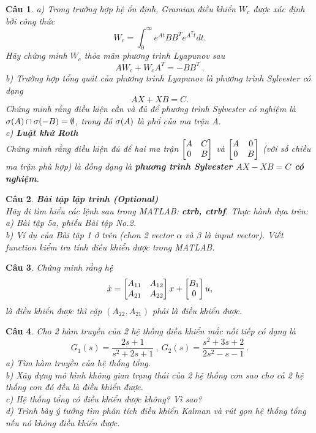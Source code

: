 \documentclass[11pt]{article}
\newtheorem{bt}{Câu}
\begin{document}
\begin{bt}
a) Trong trường hợp hệ ổn định, Gramian điều khiển $W_c$ được xác định bởi công thức
%
\[
W_c  = \int_0^{\infty} e^{At} BB^T e^{A^Tt} dt. 
\]
%
Hãy chứng minh $W_c$ thỏa mãn phương trình Lyapunov sau
%
\begin{equation}\label{lyap}
	A W_c + W_c A^T = - B B^T \ .
\end{equation}
%
b) Trường hợp tổng quát của phương trình Lyapunov là phương trình Sylvester có dạng
%
\begin{equation}\label{sylvester}
A X + X B = C.
\end{equation}
%
Chứng minh rằng điều kiện cần và đủ để phương trình Sylvester có nghiệm là 
$\sigma(A) \cap \sigma(-B) = \emptyset$, trong đó $\sigma(A)$ là phổ của ma trận A. \\
c) \textbf{Luật khử Roth} \\
Chứng minh rằng điều kiện đủ để hai ma trận $\begin{bmatrix} A & C\\0 & B \end{bmatrix}$ và $\begin{bmatrix} A & 0 \\ 0 & B \end{bmatrix}$ (với số chiều ma trận phù hợp) là đồng dạng là \textbf{phương trình Sylvester $AX - XB = C$ có nghiệm}.
\end{bt}

\begin{bt} \textbf{Bài tập lập trình (Optional)} \\
	Hãy đi tìm hiểu các lệnh sau trong MATLAB: \textbf{ctrb, ctrbf}. Thực hành dựa trên: \\
	a) Bài tập 5a, phiếu Bài tập No.2. \\
	b) Ví dụ của Bài tập 1 ở trên (chon 2 vector $\alpha$ và $\beta$ là input vector). Viết function kiểm tra tính điều khiển được trong MATLAB. 
\end{bt}   

\begin{bt}
Chứng minh rằng hệ 
%
\begin{equation}
	\dot{x} = \begin{bmatrix} A_{11} & A_{12} \\ A_{21} & A_{22} \end{bmatrix} x + \begin{bmatrix} B_1 \\ 0 \end{bmatrix} u,
\end{equation}
%
là điều khiển được thì cặp $(A_{22},A_{21})$ phải là điều khiển được.
\end{bt}

\begin{bt}
	Cho 2 hàm truyền của 2 hệ thống điều khiển mắc nối tiếp có dạng là
	\begin{equation*}
		G_1(s) = \dfrac{2s+1}{s^2+2s+1} \ , \	G_2(s) = \dfrac{s^2+3s+2}{2s^2-s-1} \ . 
	\end{equation*}
	a) Tìm hàm truyền của hệ thống tổng. \\
	b) Xây dựng mô hình không gian trạng thái của 2 hệ thống con sao cho cả 2 hệ thống con đó đều là điều khiển được. \\
	c) Hệ thống tổng có điều khiển được không? Vì sao? \\
	d) Trình bày ý tưởng tìm phân tích điều khiển Kalman và rút gọn hệ thống tổng
	nếu nó không điều khiển được.
\end{bt}
\end{document}
